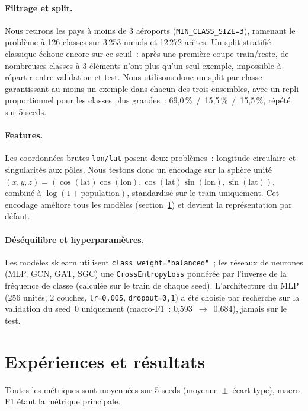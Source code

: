 \documentclass[french]{llncs}
\begin{document}
    \paragraph{Filtrage et split.} Nous retirons les pays à moins de 3 aéroports
    (\texttt{MIN\_CLASS\_SIZE=3}), ramenant le problème à 126 classes sur 3\,253 nœuds et
    12\,272 arêtes. Un split stratifié classique échoue encore sur ce seuil~: après une première
    coupe train/reste, de nombreuses classes à 3 éléments n'ont plus qu'un seul exemple,
    impossible à répartir entre validation et test. Nous utilisons donc un split par classe
    garantissant au moins un exemple dans chacun des trois ensembles, avec un repli
    proportionnel pour les classes plus grandes~: 69,0\,\%~/~15,5\,\%~/~15,5\,\%, répété sur 5 seeds.

    \paragraph{Features.} Les coordonnées brutes \texttt{lon/lat} posent deux problèmes~:
    longitude circulaire et singularités aux pôles. Nous testons donc un encodage sur la sphère
    unité $(x,y,z) = (\cos(\text{lat})\cos(\text{lon}), \cos(\text{lat})\sin(\text{lon}), \sin(\text{lat}))$,
    combiné à $\log(1+\text{population})$, standardisé sur le train uniquement. Cet encodage
    améliore tous les modèles (section~\ref{sect:results}) et devient la représentation par défaut.

    \paragraph{Déséquilibre et hyperparamètres.} Les modèles sklearn utilisent
    \texttt{class\_weight="balanced"}~; les réseaux de neurones (MLP, GCN, GAT, SGC) une
    \texttt{CrossEntropyLoss} pondérée par l'inverse de la fréquence de classe (calculée sur le
    train de chaque seed). L'architecture du MLP (256 unités, 2 couches, \texttt{lr=0,005},
    \texttt{dropout=0,1}) a été choisie par recherche sur la validation du seed~0 uniquement
    (macro-F1~: 0,593~$\rightarrow$~0,684), jamais sur le test.

    \section{Expériences et résultats} \label{sect:results}

    Toutes les métriques sont moyennées sur 5 seeds (moyenne~$\pm$~écart-type), macro-F1 étant
    la métrique principale.
\end{document}
